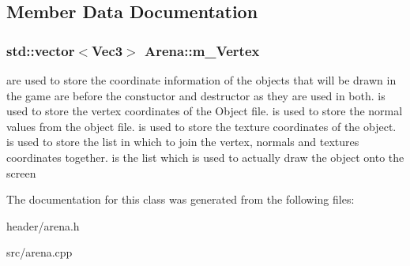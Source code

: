 \subsection{Member Data Documentation}
\hypertarget{classArena_ac59e6d56bc44072d9d7dba67e564f391}{
\subsubsection[{m\_\-Vertex}]{\setlength{\rightskip}{0pt plus 5cm}std::vector$<${\bf Vec3}$>$ {\bf Arena::m\_\-Vertex}}}
\label{classArena_ac59e6d56bc44072d9d7dba67e564f391}
are used to store the coordinate information of the objects that will be drawn in the game  are before the constuctor and destructor as they are used in both.  is used to store the vertex coordinates of the Object file.  is used to store the normal values from the object file.  is used to store the texture coordinates of the object.  is used to store the list in which to join the vertex, normals and textures coordinates together.  is the list which is used to actually draw the object onto the screen 

The documentation for this class was generated from the following files:\begin{DoxyCompactItemize}
\item 
header/arena.h\item 
src/arena.cpp\end{DoxyCompactItemize}
